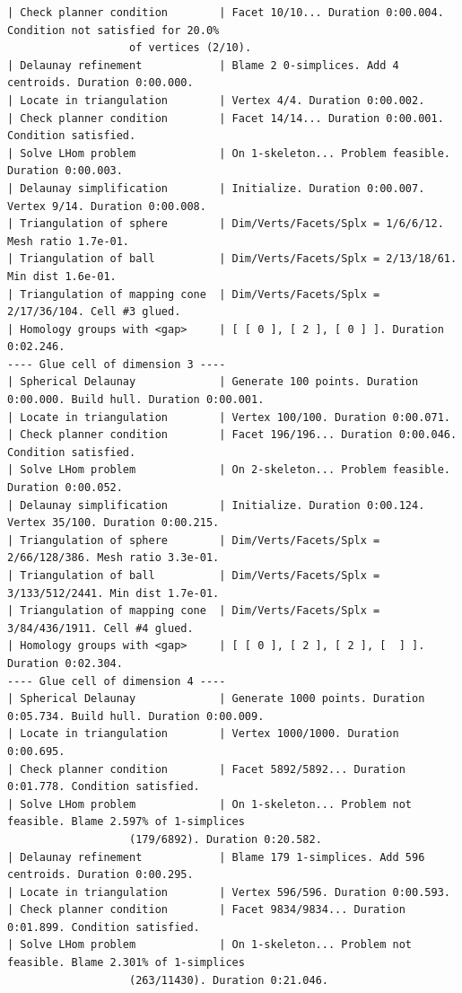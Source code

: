 \documentclass[a4paper,english,cleveref,autoref,thm-restate,nolineno]{socg-lipics-v2021}
\newcommand{\GG}{\mathcal G} %
\begin{document}
\begin{lstlisting}[style=consolestyle,caption={Console output of \Cref{alg:algorithm_full} on the Grassmannian $\GG(2,4)$},label={lst:execution}]
| Check planner condition        | Facet 10/10... Duration 0:00.004. Condition not satisfied for 20.0% 
				   of vertices (2/10).
| Delaunay refinement            | Blame 2 0-simplices. Add 4 centroids. Duration 0:00.000.
| Locate in triangulation        | Vertex 4/4. Duration 0:00.002.
| Check planner condition        | Facet 14/14... Duration 0:00.001. Condition satisfied.
| Solve LHom problem             | On 1-skeleton... Problem feasible. Duration 0:00.003.
| Delaunay simplification        | Initialize. Duration 0:00.007. Vertex 9/14. Duration 0:00.008.
| Triangulation of sphere        | Dim/Verts/Facets/Splx = 1/6/6/12. Mesh ratio 1.7e-01.
| Triangulation of ball          | Dim/Verts/Facets/Splx = 2/13/18/61. Min dist 1.6e-01.
| Triangulation of mapping cone  | Dim/Verts/Facets/Splx = 2/17/36/104. Cell #3 glued.
| Homology groups with <gap>     | [ [ 0 ], [ 2 ], [ 0 ] ]. Duration 0:02.246.
---- Glue cell of dimension 3 ---- 
| Spherical Delaunay             | Generate 100 points. Duration 0:00.000. Build hull. Duration 0:00.001.
| Locate in triangulation        | Vertex 100/100. Duration 0:00.071.
| Check planner condition        | Facet 196/196... Duration 0:00.046. Condition satisfied.
| Solve LHom problem             | On 2-skeleton... Problem feasible. Duration 0:00.052.
| Delaunay simplification        | Initialize. Duration 0:00.124. Vertex 35/100. Duration 0:00.215.
| Triangulation of sphere        | Dim/Verts/Facets/Splx = 2/66/128/386. Mesh ratio 3.3e-01.
| Triangulation of ball          | Dim/Verts/Facets/Splx = 3/133/512/2441. Min dist 1.7e-01.
| Triangulation of mapping cone  | Dim/Verts/Facets/Splx = 3/84/436/1911. Cell #4 glued.
| Homology groups with <gap>     | [ [ 0 ], [ 2 ], [ 2 ], [  ] ]. Duration 0:02.304.
---- Glue cell of dimension 4 ---- 
| Spherical Delaunay             | Generate 1000 points. Duration 0:05.734. Build hull. Duration 0:00.009.
| Locate in triangulation        | Vertex 1000/1000. Duration 0:00.695.
| Check planner condition        | Facet 5892/5892... Duration 0:01.778. Condition satisfied.
| Solve LHom problem             | On 1-skeleton... Problem not feasible. Blame 2.597% of 1-simplices 
				   (179/6892). Duration 0:20.582.
| Delaunay refinement            | Blame 179 1-simplices. Add 596 centroids. Duration 0:00.295. 
| Locate in triangulation        | Vertex 596/596. Duration 0:00.593.
| Check planner condition        | Facet 9834/9834... Duration 0:01.899. Condition satisfied.
| Solve LHom problem             | On 1-skeleton... Problem not feasible. Blame 2.301% of 1-simplices 
				   (263/11430). Duration 0:21.046.

\end{lstlisting}
\end{document}
